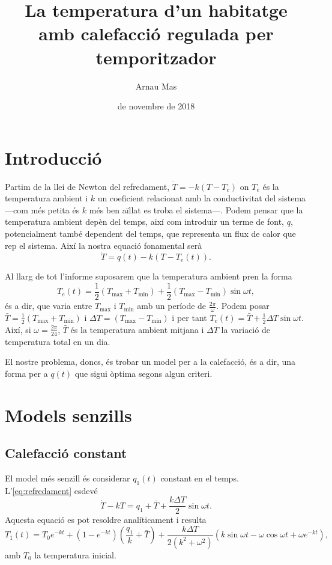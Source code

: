 \documentclass[12pt]{article}
\title{\sffamily {\bfseries Entrega 1:} La temperatura d'un habitatge amb calefacció regulada per temporitzador}
\author{\sffamily Arnau Mas}
\date{\sffamily 27 de novembre de 2018}
\numberwithin{table}{section}
\numberwithin{figure}{section}
\numberwithin{equation}{section}
\begin{document}
\maketitle
\section{Introducció}
Partim de la llei de Newton del refredament, \( \dot{T} = -k(T - T_e) \) on \( T_e \) és la temperatura ambient i \( k \) un coeficient relacionat amb la conductivitat del sistema ---com més petita és \( k \) més ben aïllat es troba el sistema---. Podem pensar que la temperatura ambient depèn del temps, així com introduir un terme de font, \( q \), potencialment també dependent del temps, que representa un flux de calor que rep el sistema. Així la nostra equació fonamental serà
\begin{equation} \label{eq:refredament}
	\dot{T} = q(t) - k(T - T_e(t)).
\end{equation}

Al llarg de tot l'informe suposarem que la temperatura ambient pren la forma
\begin{equation*}
	T_e(t) = \frac{1}{2}(T_\text{max} + T_\text{min}) + \frac{1}{2}(T_\text{max} - T_\text{min})\sin{\omega t},
\end{equation*}
és a dir, que varia entre \( T_\text{max} \) i \( T_\text{min} \) amb un període de \( \frac{2\pi}{\omega} \). Podem posar \( \bar{T} = \frac{1}{2}(T_\text{max} + T_\text{min}) \) i \( \Delta T = (T_\text{max} - T_\text{min}) \) i per tant \( T_e(t) = \bar{T} + \frac{1}{2}\Delta T \sin{\omega t} \). Així, si \( \omega = \frac{2\pi}{24} \), \( \bar{T} \) és la temperatura ambient mitjana i \( \Delta T \) la variació de temperatura total en un dia.

El nostre problema, doncs, és trobar un model per a la calefacció, és a dir, una forma per a \( q(t) \) que sigui òptima segons algun criteri.  

\section{Models senzills}
\subsection{Calefacció constant}
El model més senzill és considerar \( q_1(t) \) constant en el temps. L'\cref{eq:refredament} esdevé
\begin{equation*} 
	\dot{T} - kT = q_1 + \bar{T} + \frac{k\Delta T}{2}\sin{\omega t}.  
\end{equation*}
Aquesta equació es pot resoldre analíticament i resulta 
\begin{equation} \label{eq:solucio 1}
	T_1(t) = T_0e^{-kt} + \left(1 - e^{-kt}\right) \left(\frac{q_1}{k} + \bar{T}\right) + \frac{k \Delta T}{2(k^2 + \omega^2)}\left(k \sin{\omega t} - \omega \cos{\omega t} + \omega e^{-kt}\right),
\end{equation}
amb \( T_0 \) la temperatura inicial.
\end{document}
